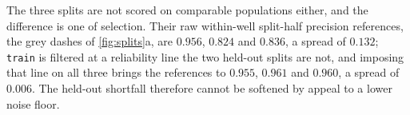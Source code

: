 The three splits are not scored on comparable populations either, and the
difference is one of selection. Their raw within-well split-half precision
references, the grey dashes of \cref{fig:splits}a, are $0.956$, $0.824$ and
$0.836$, a spread of $0.132$; \texttt{train}
is filtered at a reliability line the two held-out splits are not, and imposing
that line on all three brings the references to $0.955$, $0.961$ and $0.960$, a
spread of $0.006$. The held-out shortfall therefore cannot be softened by appeal
to a lower noise floor.

